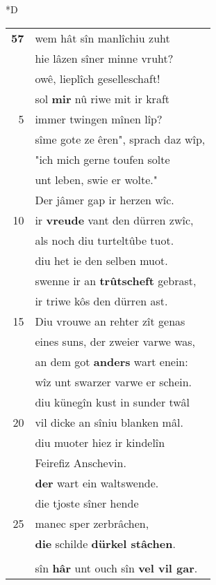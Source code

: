 \documentclass[8pt,a4paper,notitlepage]{article}
\begin{document}
\begin{table}[ht]
\begin{minipage}[t]{0.5\linewidth}
\small
\begin{center}*D
\end{center}
\begin{tabular}{rl}
\textbf{57} & wem hât sîn manlîchiu zuht\\ 
 & hie lâzen sîner minne vruht?\\ 
 & owê, lieplîch geselleschaft!\\ 
 & sol \textbf{mir} nû riwe mit ir kraft\\ 
5 & immer twingen mînen lîp?\\ 
 & sîme gote ze êren", sprach daz wîp,\\ 
 & "ich mich gerne toufen solte\\ 
 & unt leben, swie er wolte."\\ 
 & Der jâmer gap ir herzen wîc.\\ 
10 & ir \textbf{vreude} vant den dürren zwîc,\\ 
 & als noch diu turteltûbe tuot.\\ 
 & diu het ie den selben muot.\\ 
 & swenne ir an \textbf{trûtscheft} gebrast,\\ 
 & ir triwe kôs den dürren ast.\\ 
15 & Diu vrouwe an rehter zît genas\\ 
 & eines suns, der zweier varwe was,\\ 
 & an dem got \textbf{anders} wart enein:\\ 
 & wîz unt swarzer varwe er schein.\\ 
 & diu künegîn kust in sunder twâl\\ 
20 & vil dicke an sîniu blanken mâl.\\ 
 & diu muoter hiez ir kindelîn\\ 
 & Feirefiz Anschevin.\\ 
 & \textbf{der} wart ein waltswende.\\ 
 & die tjoste sîner hende\\ 
25 & manec sper zerbrâchen,\\ 
 & \textbf{die} schilde \textbf{dürkel stâchen}.\\ 
 & \textit{\begin{large}A\end{large}}ls ein agelster wart \textbf{gevar}\\ 
 & sîn \textbf{hâr} unt ouch sîn \textbf{vel vil gar}.\\ 

\end{tabular}
\end{minipage}
\end{table}
\end{document}
